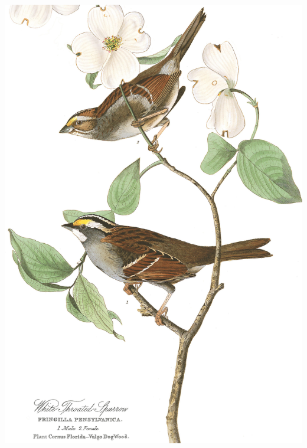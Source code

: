 \begin{marginfigure}
\begin{center}   %
  \includegraphics[width = \textwidth]{illustration_images/alleles_genotypes/White_throated_sparrow/white_throated_sparrow.jpg}
\end{center}
\caption{White-throated sparrows ({\it Zonotrichia albicollis}) with a
  white morph (bottom, male) and tan morph (top, female). The
  difference between the morphs wasn't fully appreciated until the 1960's \citep{lowther1961polymorphism}, previously birders  %
thought the tan morphs were just young or females individuals (so
Audubon's male and female labels may well by wrong). There are also a number of behavioural differences, with
both sexes of the white-striped morph invest more in territorial
defense and the tan-striped morphs more parental care.
  {\newline \noindent  \tiny{ From John James Audubon's Birds of
      America (1827). Image  
    from \href{https://www.audubon.org/birds-of-america/white-throated-sparrow}{Audubon.org},
    public domain.}}}\label{White_throated_sparrows}  
\end{marginfigure}

